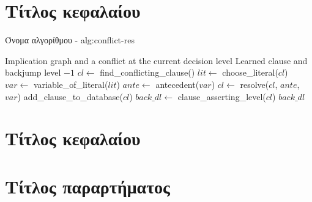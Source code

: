 \documentclass{uowmthesis}
\begin{document}












% 










\tableofcontents


% 


\chapter{Τίτλος κεφαλαίου}

\begin{myalgorithm}{Όνομα αλγορίθμου - }{alg:conflict-res}
\begin{algorithmic}[1]
    \Require Implication graph and a conflict at the current decision level
    \Ensure Learned clause and backjump level
            \State \Return $-1$
        \EndIf
        \State $cl \gets$ find\_conflicting\_clause()
            \State $lit \gets$ choose\_literal($cl$)
            \State $var \gets$ variable\_of\_literal($lit$)
            \State $ante \gets$ antecedent($var$)
            \State $cl \gets$ resolve($cl$, $ante$, $var$)
        \EndWhile
        \State add\_clause\_to\_database($cl$)
        \State $back\_dl \gets$ clause\_asserting\_level($cl$)
        \State \Return $back\_dl$
    \EndFunction
    \end{algorithmic}
\end{myalgorithm}

% 
% 

\chapter{Τίτλος κεφαλαίου}
% 
% 


\appendix
\chapter{Τίτλος παραρτήματος}

\end{document}

